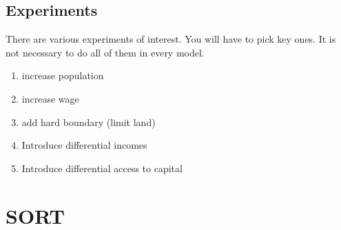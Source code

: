 \subsection{Experiments}
There are various experiments of interest. You will have to pick key ones. It is not necessary to do all of them in every model. 

	\begin{enumerate}
		\item increase population
		\item increase wage
		\item add hard boundary (limit land)
		\item Introduce differential incomes
		\item Introduce differential access to capital
	\end{enumerate}



\section{SORT}

